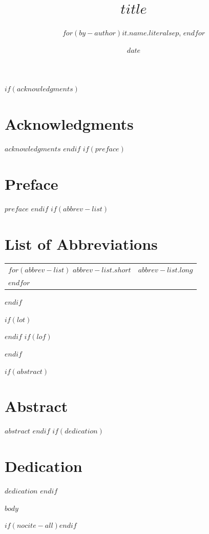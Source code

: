 \documentclass[
$if(fontsize)$$fontsize$,$endif$
  twoside,
  bibstyle=$if(bibstyle)$$bibstyle$$else$apa$endif$,
  bibfile=$if(bibliography)$$for(bibliography)$$bibliography$$sep$,$endfor$$else$references.bib$endif$,
  headerstyle=$if(headerstyle)$$headerstyle$$else$uppercase$endif$,
$for(classoption)$
  $classoption$,
$endfor$
]{reedthesis}
\title{$title$}
\author{$for(by-author)$$it.name.literal$$sep$, $endfor$}
\date{$date$}
\begin{document}
\maketitle
\frontmatter
\pagestyle{empty}

$if(acknowledgments)$
\chapter*{Acknowledgments}
$acknowledgments$
$endif$
$if(preface)$
\chapter*{Preface}
$preface$
$endif$
$if(abbrev-list)$
\chapter*{List of Abbreviations}
\begin{center}\begin{tabular}{ll}
$for(abbrev-list)$
\textbf{$abbrev-list.short$} & $abbrev-list.long$ \\
$endfor$
\end{tabular}\end{center}
$endif$

\tableofcontents
$if(lot)$\listoftables$endif$
$if(lof)$\listoffigures$endif$

$if(abstract)$
\chapter*{Abstract}
$abstract$
$endif$
$if(dedication)$
\chapter*{Dedication}
$dedication$
$endif$

\mainmatter
\pagestyle{fancyplain}

$body$

\backmatter
$if(nocite-all)$\nocite{*}$endif$
\printbibliography[heading=bibintoc]
\end{document}
